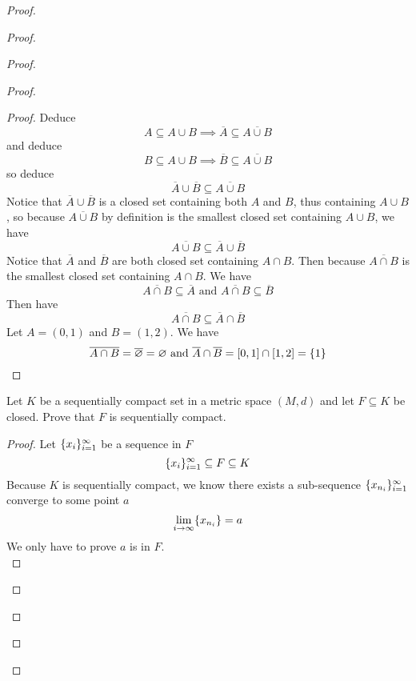\documentclass{report}
\begin{document}
\begin{proof}
\begin{proof}
\begin{proof}
\begin{proof}
\begin{proof}
Deduce
\begin{equation}
A\subseteq A\cup B\implies \overline{A}\subseteq \overline{A\cup B}
\end{equation}
and deduce
\begin{equation}
B\subseteq A\cup B\implies \overline{B}\subseteq \overline{A\cup B}
\end{equation}
so deduce
\begin{equation}
\overline{A}\cup \overline{B}\subseteq \overline{A\cup B}
\end{equation}
Notice that $\overline{A}\cup \overline{B}$ is a closed set containing both $A$ and  $B$, thus containing $A\cup B$, so because $\overline{A\cup B}$ by definition is the smallest closed set containing $A\cup B$, we have
\begin{equation}
\overline{A\cup B}\subseteq \overline{A}\cup \overline{B}
\end{equation}
Notice that $\overline{A}$ and $\overline{B}$ are both closed set containing $A\cap B$. Then because $\overline{A\cap B}$ is the smallest closed set containing  $A\cap B$. We have
\begin{equation}
\overline{A\cap B}\subseteq \overline{A}\text{ and }\overline{A\cap B}\subseteq \overline{B}
\end{equation}
Then have
\begin{equation}
\overline{A\cap B}\subseteq \overline{A}\cap \overline{B}
\end{equation}
Let $A=(0,1)$ and $B=(1,2)$. We have
\begin{equation}
\overline{A\cap B}=\overline{\varnothing}=\varnothing\text{ and }\overline{A}\cap \overline{B}=[0,1]\cap [1,2]=\{ 1 \}
\end{equation}
\end{proof}
\begin{question}{}{}

Let \( K \) be a sequentially compact set in a metric space \( (M, d) \) and let \( F \subseteq K \) be closed. Prove that \( F \) is sequentially compact.
\end{question}
\begin{proof}
Let $\{ x_i \}_{i=1}^\infty$ be a sequence in $F$
\begin{equation}
  \{ x_i \}_{i=1}^\infty \subseteq F\subseteq K
\end{equation}
Because $K$ is sequentially compact, we know there exists a sub-sequence $\{ x_{n_i} \}_{i=1}^\infty$ converge to some point $a$
 \begin{equation}
\lim_{i\to\infty}\{ x_{n_i} \}=a
\end{equation}
We only have to prove  $a$ is in  $F$.\\


\end{proof}
\end{proof}
\end{proof}
\end{proof}
\end{proof}
\end{document}
